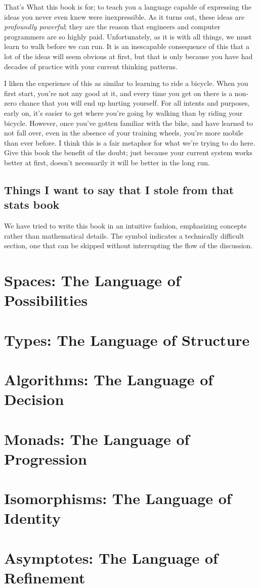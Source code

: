 \documentclass[12pt]{book}
\newcommand{\difficult}{}
\begin{document}
That's What this book is for; to teach you a language capable of
expressing the ideas you never even knew were inexpressible. As it turns out, these ideas are \textit{profoundly
powerful}; they are the reason that engineers and computer programmers are so highly paid. Unfortunately, as it is with
all things, we must learn to walk before we can run. It is an inescapable consequence of this that a lot of the ideas
will seem obvious at first, but that is only because you have had decades of practice with your current thinking
patterns.

I liken the experience of this as similar to learning to ride a bicycle.
When you first start, you're not any good at it, and every time you get on there is a non-zero chance that you will end
up hurting yourself. For all intents and purposes, early on, it's easier to get where you're going by walking than by
riding your bicycle. However, once you've gotten familiar with the bike, and have learned to not fall over, even in the
absence of your training wheels, you're more mobile than ever before. I think this is a fair metaphor for what we're
trying to do here. Give this book the benefit of the doubt; just because your current system works better at first,
doesn't necessarily it will be better in the long run.

\section{Things I want to say that I stole from that stats book}
We have tried to write this book in an intuitive fashion, emphasizing concepts rather than mathematical details.
The symbol \difficult indicates a technically difficult section, one that can be skipped without interrupting the flow
of the discussion.



\chapter{Spaces: The Language of Possibilities}
\chapter{Types: The Language of Structure}
\chapter{Algorithms: The Language of Decision}
\chapter{Monads: The Language of Progression}
\chapter{Isomorphisms: The Language of Identity}
\chapter{Asymptotes: The Language of Refinement}
\end{document}
